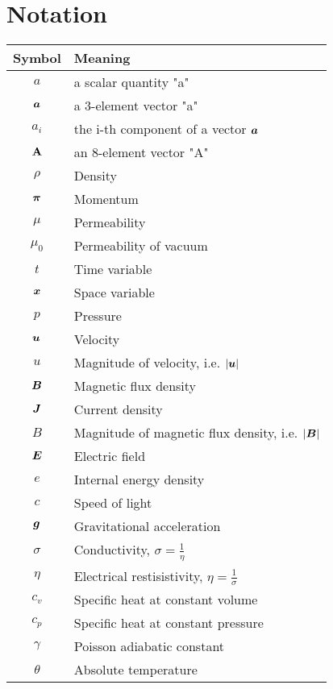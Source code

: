 \section*{Notation}

\begin{table}
    \centering
    \begin{tabular}{ |c|l| } 
        \hline
        Symbol & Meaning \\ 
        \hline
        $a$ & a scalar quantity "a"\\
        $\mbox{\boldmath $a$}$ & a 3-element vector "a"\\
        $a_i$ & the i-th component of a vector $\mbox{\boldmath $a$}$ \\
        $\mathrm{\mathbf{A}}$ & an 8-element vector "A" \\
        \hline
        $\rho$ & Density \\ 
        $\mbox{\boldmath $\pi$}$ & Momentum \\ 
        $\mu$ & Permeability \\ 
        $\mu_0$ & Permeability of vacuum\\ 
        $t$ & Time variable\\ 
        $\mbox{\boldmath $x$}$ & Space variable \\ 
        $p$ & Pressure \\ 
        $\mbox{\boldmath $u$}$ & Velocity \\ 
        $u$ & Magnitude of velocity, i.e. $|\mbox{\boldmath $u$}|$ \\ 
        $\mbox{\boldmath $B$}$ & Magnetic flux density \\ 
        $\mbox{\boldmath $J$}$ & Current density\\ 
        $B$ & Magnitude of magnetic flux density, i.e. $|\mbox{\boldmath $B$}|$ \\ 
        $\mbox{\boldmath $E$}$ & Electric field\\ 
        $e$ & Internal energy density \\ 
        $c$ & Speed of light\\ 
        $\mbox{\boldmath $g$}$ & Gravitational acceleration\\ 
        $\sigma$ & Conductivity, $\sigma = \frac{1}{\eta}$\\ 
        $\eta$ & Electrical restisistivity, $\eta = \frac{1}{\sigma}$\\
        $c_v$ & Specific heat at constant volume\\
        $c_p$ & Specific heat at constant pressure\\
        $\gamma$ & Poisson adiabatic constant\\
        $\theta$ & Absolute temperature\\

\end{tabular}
\end{table}
